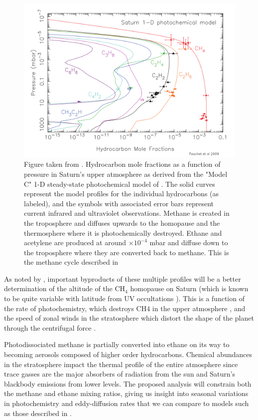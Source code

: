 \documentclass[twocolumn, twocolappendix, numberedappendix, linenumbers]{aastex631}
\newcommand{\tdex}[1]{$\times 10^{#1}$}  %
\begin{document}
\begin{figure}[ht]
\centering
\includegraphics[width=\textwidth]{figs/Fouchet09.png}

\caption{
\footnotesize
Figure taken from \cite{Fouchet2009}. Hydrocarbon mole fractions as a function of
pressure in Saturn's upper atmosphere as derived from the "Model C" 1-D
steady-state photochemical model of \cite{Moses2005}. The solid curves represent
the model profiles for the individual hydrocarbons (as labeled), and the
symbols with associated error bars represent current infrared and ultraviolet
observations. Methane is created in the troposphere and diffuses upwards to the
homopause and the thermosphere where it is photochemically destroyed. Ethane
and acetylene are produced at around \tdex{-4} mbar and diffuse down to the
troposphere where they are converted back to methane. This is the methane cycle
described in \cite{Strobel1969}
}

\label{fig:FouchetPlot}
\end{figure}

As noted by \cite{Fouchet2009}, important byproducts of these multiple profiles
will be a better determination of the altitude of the CH$_4$ homopause on
Saturn (which is known to be quite variable with latitude from UV occultations
\citealp{Koskinen2018}). This is a function of the rate of
photochemistry, which destroys CH$4$ in the upper atmosphere \citep{Fouchet2009},
and the speed of zonal winds in the stratosphere which distort the shape of the
planet through the centrifugal force \citep{Merritt2019}. 

Photodissociated methane is partially converted into ethane on its way to
becoming aerosols composed of higher order hydrocarbons. Chemical abundances in
the stratosphere impact the thermal profile of the entire atmosphere since
trace gasses are the major absorbers of radiation from the sun and Saturn's
blackbody emissions from lower levels. The proposed analysis will constrain
both the methane and ethane mixing ratios, giving us insight into seasonal
variations in photochemistry and eddy-diffusion rates that we can compare to
models such as those described in \cite{Moses2005}.
\end{document}
